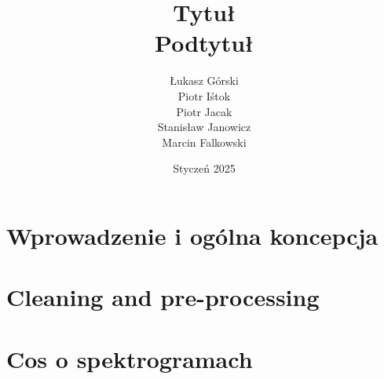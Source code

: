 \documentclass[11pt, letterpaper]{article}
\title{\textbf {Tytuł} \\ \large Podtytuł}
\author{Łukasz Górski \\ Piotr Iśtok \\ Piotr Jacak \\ Stanisław Janowicz \\ Marcin Falkowski}
\date{Styczeń 2025}
\begin{document}
\maketitle

\newpage
\tableofcontents
\newpage

\section{Wprowadzenie i ogólna koncepcja}
\section{Cleaning and pre-processing}
\section{Cos o spektrogramach}
\end{document}
